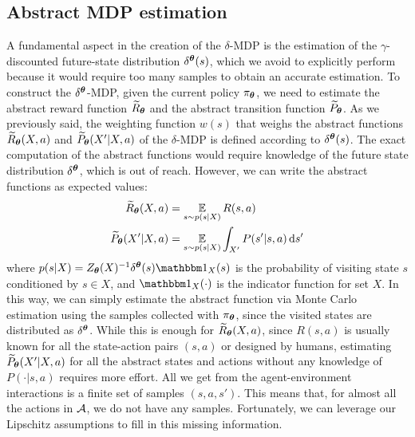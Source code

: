 \subsection{Abstract MDP estimation}\label{sec:mdpest}
A fundamental aspect in the creation of the $\delta$-\ac{MDP} is the estimation of the $\gamma$-discounted future-state distribution $\delta^{\boldsymbol{\theta}}(s)$, which we avoid to explicitly perform because it would require too many samples to obtain an accurate estimation.
To construct the $\delta^{\boldsymbol{\theta}}$-\ac{MDP}, given the current policy $\pi_{\boldsymbol{\theta}}$, we need to estimate the abstract reward function $\widetilde{R}_{\boldsymbol{\theta}}$ and the abstract transition function $\widetilde{P}_{\boldsymbol{\theta}}$. As we previously said, the weighting function $w(s)$ that weighs the abstract functions $\widetilde{R}_{\boldsymbol{\theta}}(X, a)$ and $\widetilde{P}_{\boldsymbol{\theta}}(X'|X, a)$ of the $\delta$-\ac{MDP} is defined according to $\delta^{\boldsymbol{\theta}}(s)$. The exact computation of the abstract functions would require knowledge of the future state distribution $\delta^{\boldsymbol{\theta}}$, which is out of reach. 
However, we can write the abstract functions as expected values:
\begin{align}
\widetilde{R}_{\boldsymbol{\theta}}(X, a) &= \operatorname*{\mathbb{E}}_{s \sim p(s | X)} R(s, a) \label{eq:mcr}\\
\widetilde{P}_{\boldsymbol{\theta}}(X' | X, a) &= \operatorname*{\mathbb{E}}_{s \sim p(s | X)} \int_{X'} P(s' | s, a) \,\mathrm{d} s'\label{eq:mcp}
\end{align}
where $p(s | X) = Z_{\vtheta}(X)^{-1}\delta^{\vtheta}(s)\Ind_X(s)$ is the probability of visiting state $s$ conditioned by $s\in X$, and $\Ind_X(\cdot)$ is the indicator function for set $X$.
In this way, we can simply estimate the abstract function via Monte Carlo estimation using the samples collected with $\pi_{\boldsymbol{\theta}}$, since the visited states are distributed as $\delta^{\boldsymbol{\theta}}$.
While this is enough for $\widetilde{R}_{\boldsymbol{\theta}}(X, a)$, since $R(s, a)$ is usually known for all the state-action pairs $(s,a)$ or designed by humans, estimating $\widetilde{P}_{\boldsymbol{\theta}}(X'|X, a)$ for all the abstract states and actions without any knowledge of $P(\cdot|s, a)$ requires more effort. All we get from the agent-environment interactions is a finite set of samples $(s,a,s')$. This means that, for almost all the actions in $\mathcal{A}$, we do not have any samples. Fortunately, we can leverage our Lipschitz assumptions to fill in this missing information.\\
